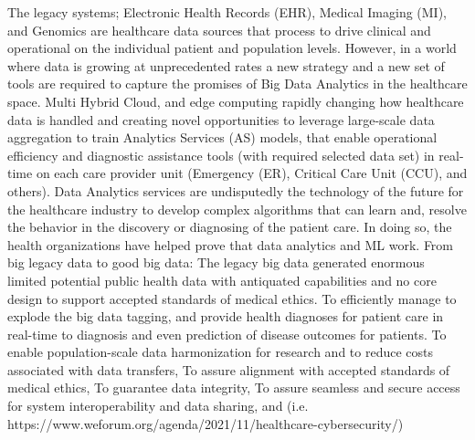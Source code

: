 The legacy systems; Electronic Health Records (EHR), Medical Imaging (MI), and Genomics are healthcare data sources that process to drive clinical and operational on the individual patient and population levels. However, in a world where data is growing at unprecedented rates a new strategy and a new set of tools are required to capture the promises of Big Data Analytics in the healthcare space. Multi Hybrid Cloud, and edge computing rapidly changing how healthcare data is handled and creating novel opportunities to leverage large-scale data aggregation to train Analytics Services (AS) models, that enable operational efficiency and diagnostic assistance tools (with required selected data set) in real-time on each care provider unit (Emergency (ER), Critical Care Unit (CCU), and others).
Data Analytics services are undisputedly the technology of the future for the healthcare industry to develop complex algorithms that can learn and, resolve the behavior in the discovery or diagnosing of the patient care. In doing so, the health organizations have helped prove that data analytics and ML work.
From big legacy data to good big data:
The legacy big data generated enormous limited potential public health data with antiquated capabilities and no core design to support accepted standards of medical ethics.
To efficiently manage to explode the big data tagging, and provide health diagnoses for patient care in real-time to diagnosis and even prediction of disease outcomes for patients.
To enable population-scale data harmonization for research and to reduce costs associated with data transfers,
To assure alignment with accepted standards of medical ethics,
To guarantee data integrity,
To assure seamless and secure access for system interoperability and data sharing, and (i.e. https://www.weforum.org/agenda/2021/11/healthcare-cybersecurity/)


